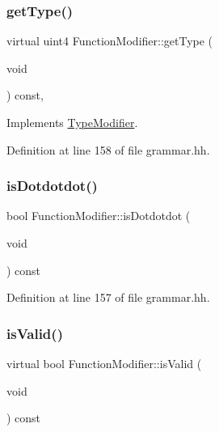 \mbox{\label{class_function_modifier_a3d9dd30cfeee023391479e84b57e0c91}} 
\subsubsection{\texorpdfstring{getType()}{getType()}}
{\footnotesize\ttfamily virtual uint4 Function\+Modifier\+::get\+Type (\begin{DoxyParamCaption}\item[{void}]{ }\end{DoxyParamCaption}) const\hspace{0.3cm}{\ttfamily [inline]}, {\ttfamily [virtual]}}



Implements \mbox{\hyperlink{class_type_modifier_aac3cedefacdceace7669f57b9bd42df6}{Type\+Modifier}}.



Definition at line 158 of file grammar.\+hh.

\mbox{\label{class_function_modifier_a82d55cae0f01c43840d22a3ca4dd61c1}} 
\subsubsection{\texorpdfstring{isDotdotdot()}{isDotdotdot()}}
{\footnotesize\ttfamily bool Function\+Modifier\+::is\+Dotdotdot (\begin{DoxyParamCaption}\item[{void}]{ }\end{DoxyParamCaption}) const\hspace{0.3cm}{\ttfamily [inline]}}



Definition at line 157 of file grammar.\+hh.

\mbox{\label{class_function_modifier_a3ce17649de258e786a221834a225e806}} 
\subsubsection{\texorpdfstring{isValid()}{isValid()}}
{\footnotesize\ttfamily virtual bool Function\+Modifier\+::is\+Valid (\begin{DoxyParamCaption}\item[{void}]{ }\end{DoxyParamCaption}) const\hspace{0.3cm}{\ttfamily [virtual]}}



